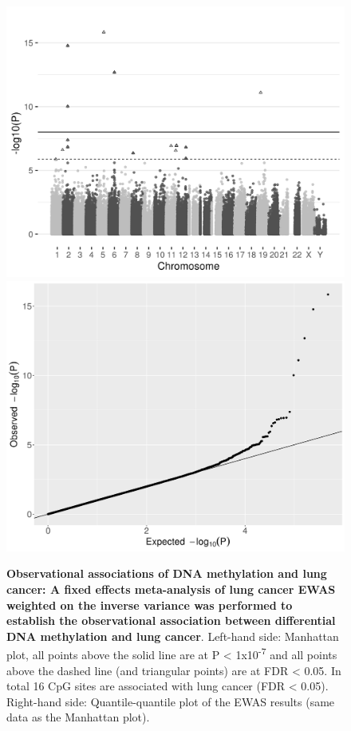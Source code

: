 \documentclass[11pt,oneside]{bristolthesis}
\newcommand{\blandscape}{\begin{landscape}}
\newcommand{\elandscape}{\end{landscape}}
\begin{document}
\blandscape
\begin{figure}[htbp]
\includegraphics[width=0.5\linewidth]{figure/07-dnam_lungcancer_mr/Figure_2a} \includegraphics[width=0.5\linewidth]{figure/07-dnam_lungcancer_mr/Figure_2b} \caption[Observational associations of DNA methylation and lung cancer: A fixed effects meta-analysis of lung cancer EWAS weighted on the inverse variance was performed to establish the observational association between differential DNA methylation and lung cancer]{\textbf{Observational associations of DNA methylation and lung cancer: A fixed effects meta-analysis of lung cancer EWAS weighted on the inverse variance was performed to establish the observational association between differential DNA methylation and lung cancer}. Left-hand side: Manhattan plot, all points above the solid line are at P \textless{} 1x10\textsuperscript{-7} and all points above the dashed line (and triangular points) are at FDR \textless{} 0.05. In total 16 CpG sites are associated with lung cancer (FDR \textless{} 0.05). Right-hand side: Quantile-quantile plot of the EWAS results (same data as the Manhattan plot).}\label{fig:fig2-07}
\end{figure}
\elandscape
\end{document}
